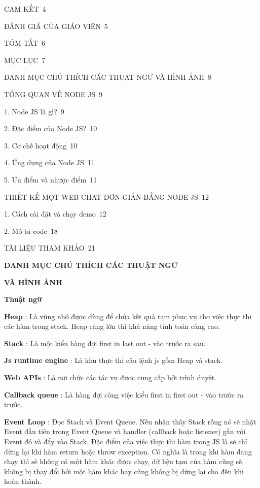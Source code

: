\documentclass{report}
\begin{document}
\smallskip
CAM KẾT\dotfill\ 4

\smallskip
ĐÁNH GIÁ CỦA GIÁO VIÊN\dotfill\ 5

\smallskip
TÓM TẮT\dotfill\ 6

\smallskip
MỤC LỤC\dotfill\ 7

\smallskip
DANH MỤC CHÚ THÍCH CÁC THUẬT NGỮ VÀ HÌNH ẢNH\dotfill\ 8

\smallskip
TỔNG QUAN VỀ NODE JS\dotfill\ 9

\setlength{\parindent}{0.5cm}
1. Node JS là gì?\dotfill\ 9

2. Đặc điểm của Node JS?\dotfill\ 10

3. Cơ chế hoạt động\dotfill\ 10

4. Ứng dụng của Node JS\dotfill\ 11

5. Ưu điểm và nhược điểm\dotfill\ 11

\setlength{\parindent}{0cm}
\smallskip
THIẾT KẾ MỘT WEB CHAT ĐƠN GIẢN BẰNG NODE JS\dotfill\ 12

\setlength{\parindent}{0.5cm}
1. Cách cài đặt và chạy demo\dotfill\ 12

2. Mô tả code\dotfill\ 18

\setlength{\parindent}{0cm}
\smallskip
TÀI LIỆU THAM KHẢO\dotfill\ 21

\newpage
\changefontsizes{16pt}
\centerline{\textbf{DANH MỤC CHÚ THÍCH CÁC THUẬT NGỮ}}
\centerline{\textbf{VÀ HÌNH ẢNH}}

\vspace{1cm}
\changefontsizes{14pt}
\textbf{Thuật ngữ}

\changefontsizes{13pt}
\bigskip
\textbf{Heap} : Là vùng nhớ được dùng để chứa kết quả tạm phục vụ cho việc thực thi các hàm trong stack. Heap càng lớn thì khả năng tính toán càng cao.

\smallskip
\textbf{Stack} : Là một kiểu hàng đợi first in last out - vào trước ra sau.

\smallskip
\textbf{Js runtime engine} : Là khu thực thi câu lệnh js gồm Heap và stack.

\smallskip
\textbf{Web APIs} : Là nơi chức các tác vụ được cung cấp bởi trình duyệt.

\smallskip
\textbf{Callback queue} : Là hàng đợi công việc kiểu first in first out - vào trước ra trước.

\smallskip
\textbf{Event Loop} :  Đọc Stack và Event Queue. Nếu nhận thấy Stack rỗng nó sẽ nhặt Event đầu tiên trong Event Queue và handler (callback hoặc listener) gắn với Event đó và đẩy vào Stack. Đặc điểm của việc thực thi hàm trong JS là sẽ chỉ dừng lại khi hàm return hoặc throw exception. Có nghĩa là trong khi hàm đang chạy thì sẽ không có một hàm khác được chạy, dữ liệu tạm của hàm cũng sẽ không bị thay đổi bởi một hàm khác hay cũng không bị dừng lại cho đến khi hoàn thành.
\end{document}
